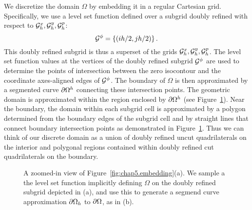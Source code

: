 We discretize the domain $\Omega$ by embedding it in a regular Cartesian grid. Specifically, we use a level set function defined over a subgrid doubly refined with respect to $\mathcal{G}^x_h, \mathcal{G}^y_h, \mathcal{G}^p_h$:
\begin{equation*}
\mathcal{G}^{\phi} = \left\lbrace (ih/2, jh/2) \right\rbrace.
\end{equation*}
This doubly refined subgrid is thus a superset of the grids $\mathcal{G}^x_h, \mathcal{G}^y_h, \mathcal{G}^p_h$. The level set function values at the vertices of the doubly refined subgrid $\mathcal{G}^{\phi}$ are used to determine the points of intersection between the zero isocontour and the coordinate axes-aligned edges of $\mathcal{G}^{\phi}$. The boundary of $\Omega$ is then approximated by a segmented curve $\partial\Omega^h$ connecting these intersection points. The geometric domain is approximated within the region enclosed by $\partial\Omega^h$ (see Figure~\ref{fig:chap5.boundary}). Near the boundary, the domain within each subgrid cell is approximated by a polygon determined from the boundary edges of the subgrid cell and by straight lines that connect boundary intersection points as demonstrated in Figure~\ref{fig:chap5.boundary}. Thus we can think of our discrete domain as a union of doubly refined uncut quadrilaterals on the interior and polygonal regions contained within doubly refined cut quadrilaterals on the boundary.

\setlength{\figurewidth}{0.50\textwidth}
\begin{figure}[htbp]
\centering
{}
\caption{A zoomed-in view of Figure~\ref{fig:chap5.embedding}(a). We sample a the level set function implicitly defining $\Omega$ on the doubly refined subgrid depicted in (a), and use this to generate a segmend curve approximation $\partial\Omega_h$ to $\partial\Omega$, as in (b).}
\label{fig:chap5.boundary}
\end{figure}

